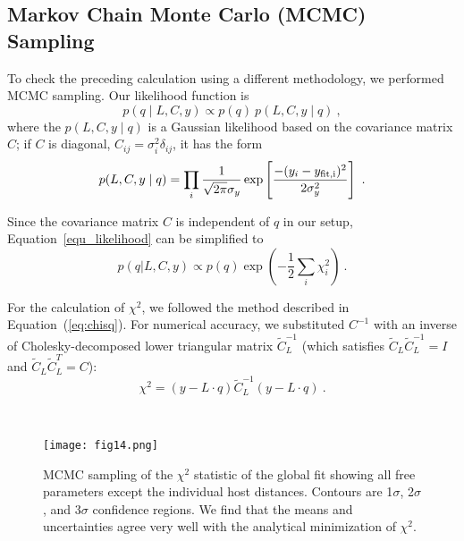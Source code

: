 \documentclass[12pt]{aastex631}
\begin{document}
\subsection{Markov Chain Monte Carlo (MCMC) Sampling\label{sc:5.1}}

To check the preceding calculation using a different methodology, we performed MCMC sampling. Our likelihood function is
\begin{equation}\label{equ_likelihood}
    p(q\mid L,C,y) \propto p(q)\ p(L,C,y\mid q)\ ,
\end{equation}
where the $p(L,C,y\mid q)$ is a Gaussian likelihood based on the covariance matrix $ C $; if $ C $ is diagonal, $ C_{ij} = \sigma_i^2 \delta_{ij} $, it has the form
\begin{equation}
    p(L,C,y\mid q) = \prod_i \frac{1}{\sqrt{2\pi}\sigma_y}
    \exp\left[\frac{-(y_i-y_{\rm{fit},i})^2}{2\sigma_y^2}\right]\ .
\end{equation}

Since the covariance matrix $ C $ is independent of $q$ in our setup, Equation~\ref{equ_likelihood} can be simplified to
\begin{equation}
    p(q|L,C,y)\propto p(q) \exp\left(-\frac{1}{2}\sum_i \chi_i^2\right)\ .
\end{equation}

For the calculation of $\chi^2$, we followed the method described in Equation~(\ref{eq:chisq}). For numerical accuracy, we substituted $C^{-1}$ with an inverse of Cholesky-decomposed lower triangular matrix $\tilde C_L^{-1}$ (which satisfies $\tilde C_L \tilde C_L^{-1}=I$ and $\tilde C_L \tilde C_L^T=C$):
\begin{equation}
    \chi^2 = \left(y-L\cdot q\right)\tilde C_L^{-1}\left(y-L\cdot q\right)\ . \label{eq:chimc}
\end{equation}

\clearpage

\ \par
\begin{figure}[b]
\texttt{[image: fig14.png]}
\caption{\label{fg:corner} MCMC sampling of the $\chi^2$ statistic of the global fit showing all free parameters except the individual host distances.  Contours are 1$\sigma$, 2$\sigma$, and 3$\sigma$ confidence regions.  We find that the means and uncertainties agree very well with the analytical minimization of $\chi^2$.}
\end{figure}

\clearpage
\end{document}
